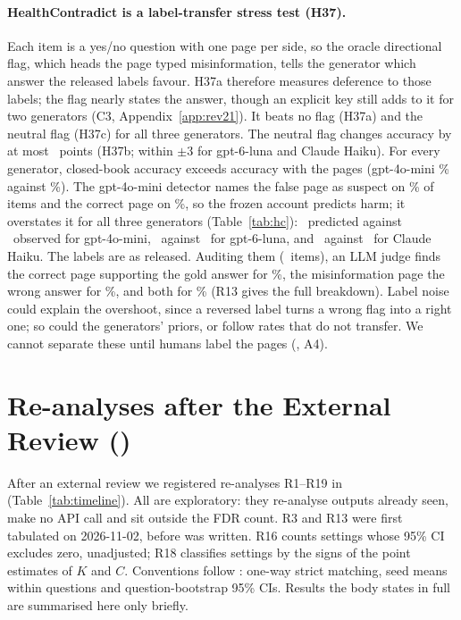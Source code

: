 \paragraph{HealthContradict is a label-transfer stress test (H37).} Each item is a yes/no question with one page per
side, so the oracle directional flag, which heads the page typed misinformation, tells the generator which answer the
released labels favour. H37a therefore measures deference to those labels; the flag nearly states the answer, though an explicit key still
adds to it for two generators (C3, Appendix~\ref{app:rev21}).
It beats no flag (H37a) and the neutral flag (H37c) for all three generators. The neutral flag changes accuracy by at
most \ahcNeuMini\ points (H37b; within $\pm$3 for gpt-6-luna and Claude Haiku). For every generator, closed-book
accuracy exceeds accuracy with the pages (gpt-4o-mini \hcCbMini\% against \hcPlainMini\%). The gpt-4o-mini detector
names the false page as suspect on \hcLlmRightMini\% of items and the correct page on \hcLlmWrongMini\%, so the frozen
account predicts harm; it overstates it for all three generators (Table~\ref{tab:hc}): \hcLlmPredMini\ predicted
against \hcLlmMini\ observed for gpt-4o-mini, \hcLlmPredLuna\ against \hcLlmLuna\ for gpt-6-luna, and
\hcLlmPredHaiku\ against \hcLlmHaiku\ for Claude Haiku. The labels are as released. Auditing them (\hcLabN\ items), an
LLM judge finds the correct page supporting the gold answer for \hcLabCorrect\%, the misinformation page the wrong
answer for \hcLabMis\%, and both for \hcLabBoth\% (R13 gives the full breakdown). Label noise could explain the
overshoot, since a reversed label turns a wrong flag into a right one; so could the generators' priors, or follow
rates that do not transfer. We cannot separate these until humans label the pages (, A4).

\clearpage
\section{Re-analyses after the External Review ()}
\label{app:rev11}
After an external review we registered re-analyses R1--R19 in  (Table~\ref{tab:timeline}). All are
exploratory: they re-analyse outputs already seen, make no API call and sit outside the FDR count. R3 and R13 were
first tabulated on 2026-11-02, before  was written. R16 counts settings whose 95\% CI excludes zero,
unadjusted; R18 classifies settings by the signs of the point estimates of $K$ and $C$. Conventions follow : one-way strict matching, seed means within questions and question-bootstrap
95\% CIs. Results the body states in full are summarised here only briefly.

